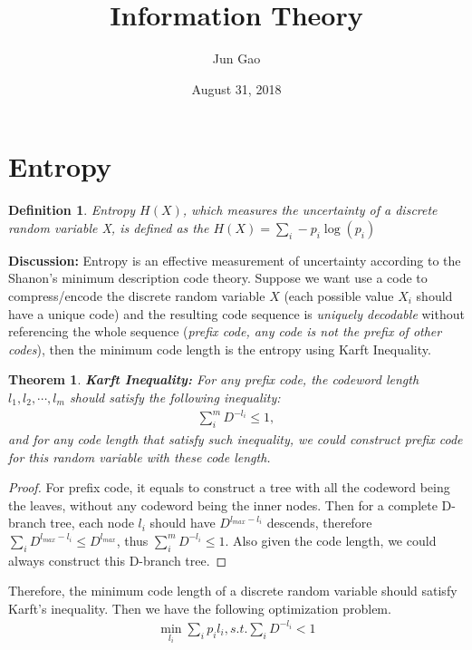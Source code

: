 \documentclass[12pt]{article}
\newtheorem{theorem}{Theorem}
\newtheorem{definition}{Definition}
\begin{document}
 
\title{Information Theory}
\author{Jun Gao}
\date{August 31, 2018}

\maketitle
\section{Entropy}
\begin{definition}
	Entropy $H(X)$, which measures the uncertainty of a discrete random variable X, is defined as the $H(X)=\sum_i - p_i \log(p_i)$
\end{definition}
\textbf{Discussion: } Entropy is an effective measurement of uncertainty according to the Shanon's minimum description code theory. Suppose we want use a code to compress/encode the discrete random variable $X$ (each possible value $X_i$ should have a unique code) and the resulting code sequence is \textit{uniquely decodable} without referencing the whole sequence (\textit{prefix code, any code is not the prefix of other codes}), then the minimum code length is the entropy using Karft Inequality. 
\begin{theorem}
	\textbf{Karft Inequality:} For any prefix code, the codeword length $l_1,l_2,\cdots,l_m$ should satisfy the following inequality:
	\begin{eqnarray}
		\sum_i^m D^{-l_i} \le 1,
	\end{eqnarray} 
	and for any code length that satisfy such inequality, we could construct prefix code for this random variable with these code length.
\end{theorem}
\begin{proof}
	For prefix code, it equals to construct a tree with all the codeword being the leaves, without any codeword being the inner nodes. Then for a complete D-branch tree, each node $l_i$ should have $D^{l_{max}-l_i}$ descends, therefore $\sum_i D^{l_{max}-l_i} \le D^{l_{max}}$, thus $\sum_i^m D^{-l_i} \le 1$. Also given the code length, we could always construct this D-branch tree.
\end{proof}
Therefore, the minimum code length of a discrete random variable should satisfy Karft's inequality. Then we have the following optimization problem.
\begin{eqnarray}
	\min_{l_i} \sum_i p_il_i, s.t. \sum_i D^{-l_i}<1
\end{eqnarray}
\end{document}
